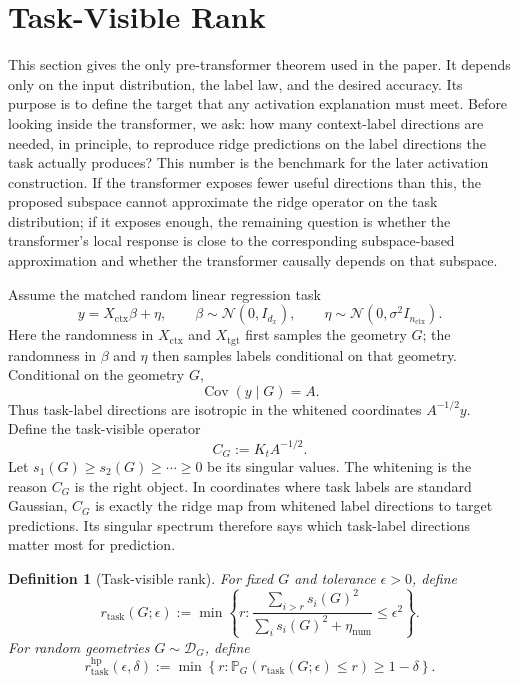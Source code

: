 \documentclass[11pt]{article}
\newtheorem{definition}{Definition}
\newcommand{\Cov}{\operatorname{Cov}}
\begin{document}
\section{Task-Visible Rank}

This section gives the only pre-transformer theorem used in the paper. It depends only on the
input distribution, the label law, and the desired accuracy. Its purpose is to define the target
that any activation explanation must meet. Before looking inside the transformer, we ask: how
many context-label directions are needed, in principle, to reproduce ridge predictions on the label
directions the task actually produces? This number is the benchmark for the later activation
construction. If the transformer exposes fewer useful directions than this, the proposed subspace
cannot approximate the ridge operator on the task distribution; if it exposes enough, the remaining
question is whether the transformer's local response is close to the corresponding subspace-based
approximation and whether the transformer causally depends on that subspace.

Assume the matched random linear regression task
\[
y=X_{\mathrm{ctx}}\beta+\eta,\qquad
\beta\sim \mathcal{N}(0,I_{d_x}),\qquad
\eta\sim \mathcal{N}(0,\sigma^2 I_{n_{\mathrm{ctx}}}).
\]
Here the randomness in \(X_{\mathrm{ctx}}\) and \(X_{\mathrm{tgt}}\) first samples the geometry \(G\);
the randomness in \(\beta\) and \(\eta\) then samples labels conditional on that geometry.
Conditional on the geometry \(G\),
\[
\Cov(y\mid G)=A.
\]
Thus task-label directions are isotropic in the whitened coordinates \(A^{-1/2}y\). Define the
task-visible operator
\[
C_G := K_tA^{-1/2}.
\]
Let \(s_1(G)\ge s_2(G)\ge\cdots\ge 0\) be its singular values. The whitening is the reason \(C_G\)
is the right object. In coordinates where task labels are standard Gaussian, \(C_G\) is exactly the
ridge map from whitened label directions to target predictions. Its singular spectrum therefore
says which task-label directions matter most for prediction.

\begin{definition}[Task-visible rank]
For fixed \(G\) and tolerance \(\epsilon>0\), define
\[
r_{\mathrm{task}}(G;\epsilon)
:=
\min\left\{
r:
\frac{\sum_{i>r}s_i(G)^2}{\sum_i s_i(G)^2+\eta_{\mathrm{num}}}
\le \epsilon^2
\right\}.
\]
For random geometries \(G\sim\mathcal{D}_G\), define
\[
r_{\mathrm{task}}^{\mathrm{hp}}(\epsilon,\delta)
:=
\min\left\{
r:
\mathbb{P}_G\!\left(r_{\mathrm{task}}(G;\epsilon)\le r\right)\ge 1-\delta
\right\}.
\]
\end{definition}
\end{document}
